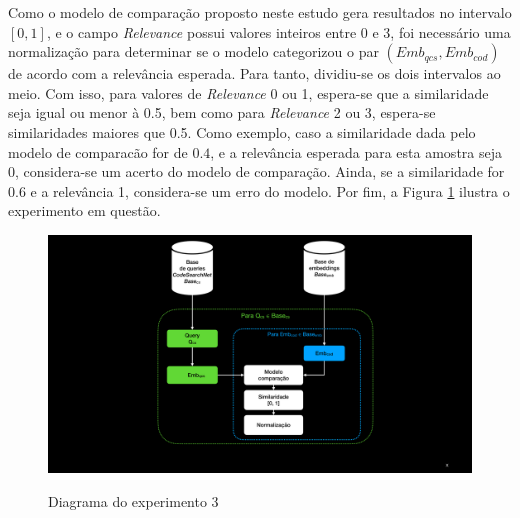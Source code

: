 Como o modelo de comparação proposto neste estudo gera resultados no intervalo $[0, 1]$, e o campo \textit{Relevance} possui valores inteiros entre 0 e 3, foi necessário uma normalização para determinar se o modelo categorizou o par $(Emb_{qcs}, Emb_{cod})$ de acordo com a relevância esperada. Para tanto, dividiu-se os dois intervalos ao meio. Com isso, para valores de \textit{Relevance} 0 ou 1, espera-se que a similaridade seja igual ou menor à 0.5, bem como para \textit{Relevance} 2 ou 3, espera-se similaridades maiores que 0.5. Como exemplo, caso a similaridade dada pelo modelo de comparacão for de $0.4$, e a relevância esperada para esta amostra seja 0, considera-se um acerto do modelo de comparação. Ainda, se a similaridade for $0.6$ e a relevância 1, considera-se um erro do modelo. Por fim, a Figura \ref{fig:experiment-3-diagram} ilustra o experimento em questão.

\begin{figure}[H]
    \centering
        \caption{Diagrama do experimento 3}
        \includegraphics[scale=0.4]{imagens/proposta-experimental/experiment-3.pdf}
        \label{fig:experiment-3-diagram}
\end{figure}
